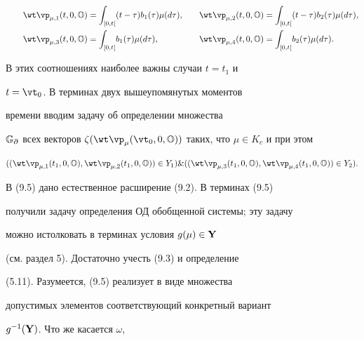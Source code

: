 \begin{alignat*}{2}


{{\wt \vp}_{\mu,1}}(t,0,{\Bbb O}) &=


{\int_{[0,t[}}(t - \tau){b_1}(\tau){\mu}(d\tau), &\quad


{{\wt \vp}_{\mu,2}}(t,0,{\Bbb O}) &=


{\int_{[0,t[}}(t - \tau){b_2}(\tau){\mu}(d\tau),\\


\qquad {}{{\wt \vp}_{\mu,3}}(t,0,{\Bbb O}) &=


{\int_{[0,t[}}{b_1}(\tau){\mu}(d\tau), &\quad


{{\wt \vp}_{\mu,4}}(t,0,{\Bbb O}) &= {\int_{[0,t[}}{b_2}(\tau){\mu}(d\tau).


\end{alignat*}


В этих соотношениях наиболее важны случаи $t = {t_1}$ и


$t = {{\vt}_0}$. В терминах двух вышеупомянутых моментов


времени вводим задачу об определении множества


${\Bbb G}_\partial$ всех векторов ${\zeta}({{\wt \vp}_\mu}({{\vt}_0},


0,{\Bbb O}))$ таких, что $\mu \in {K_c}$ и при этом


\begin{equation}


(({{\wt \vp}_{\mu,1}}({t_1},0,{\Bbb O}),{{\wt \vp}_{\mu,2}}({t_1},


0,{\Bbb O})) \in {Y_1}) \& (({{\wt \vp}_{\mu,3}}({t_1},0,{\Bbb O}),


{{\wt \vp}_{\mu,4}}({t_1},0,{\Bbb O})) \in {Y_2}).


\end{equation}





В (9.5) дано естественное расширение (9.2). В терминах (9.5)


получили задачу определения ОД обобщенной системы; эту задачу


можно истолковать в терминах условия ${g(\mu)} \in {\bold Y}$


(см. раздел 5). Достаточно учесть (9.3) и определение


(5.11). Разумеется, (9.5) реализует в виде множества


допустимых элементов соответствующий конкретный вариант


${g^{-1}}({\bold Y})$. Что же касается $\omega$,


